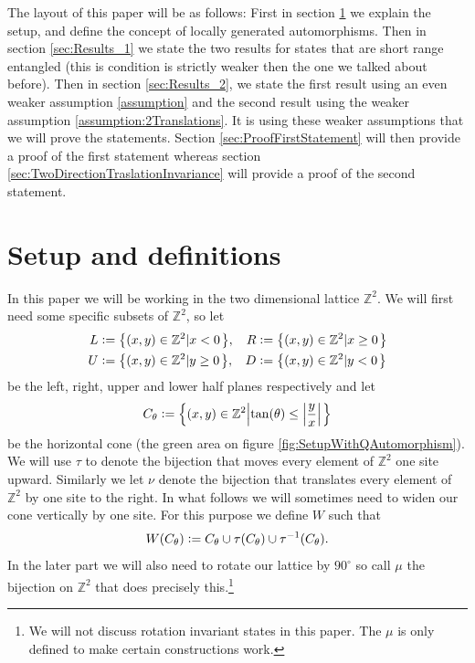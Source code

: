 \documentclass[12pt,a4paper,twoside]{article}
\newcommand{\defeq}{\vcentcolon=}
\let\originalleft\left
\let\originalright\right
\renewcommand{\left}{\mathopen{}\mathclose\bgroup\originalleft}
\renewcommand{\right}{\aftergroup\egroup\originalright}
\newcommand{\ZZ}{\mathbb Z}
\theoremstyle{definition}
\numberwithin{equation}{section}
\begin{document}
The layout of this paper will be as follows: First in section \ref{sec:Setup} we explain the setup, and define the concept of locally generated automorphisms. Then in section \ref{sec:Results_1} we state the two results for states that are short range entangled (this is condition is strictly weaker then the one we talked about before). Then in section \ref{sec:Results_2}, we state the first result using an even weaker assumption \ref{assumption} and the second result using the weaker assumption \ref{assumption:2Translations}. It is using these weaker assumptions that we will prove the statements. Section \ref{sec:ProofFirstStatement} will then provide a proof of the first statement whereas section \ref{sec:TwoDirectionTraslationInvariance} will provide a proof of the second statement.
\section{Setup and definitions}\label{sec:Setup}
In this paper we will be working in the two dimensional lattice $\ZZ^2$. We will first need some specific subsets of $\ZZ^2$, so let
\begin{align}
	L&\defeq \left\{(x,y)\in\ZZ^2\left|x<0\right.\right\},&R&\defeq \left\{(x,y)\in\ZZ^2\left|x\geq 0\right.\right\}\\
	U&\defeq \left\{(x,y)\in\ZZ^2\left|y\geq 0\right.\right\},&D&\defeq \left\{(x,y)\in\ZZ^2\left|y<0\right.\right\}
\end{align}
be the left, right, upper and lower half planes respectively and let
\begin{equation}
	C_\theta\defeq \left\{(x,y)\in\ZZ^2\left|\tan(\theta)\leq\abs{\frac{y}{x}}\right.\right\}
\end{equation}
be the horizontal cone (the green area on figure \ref{fig:SetupWithQAutomorphism}). We will use $\tau$ to denote the bijection that moves every element of $\ZZ^2$ one site upward. Similarly we let $\nu$ denote the bijection that translates every element of $\ZZ^2$ by one site to the right. In what follows we will sometimes need to widen our cone vertically by one site. For this purpose we define $W$ such that
\begin{equation}
	W(C_\theta)\defeq C_\theta\cup\tau(C_\theta)\cup\tau^{-1}(C_\theta).
\end{equation}
In the later part we will also need to rotate our lattice by $90^\circ$ so call $\mu$ the bijection on $\ZZ^2$ that does precisely this.\footnote{We will not discuss rotation invariant states in this paper. The $\mu$ is only defined to make certain constructions work.}
\end{document}
